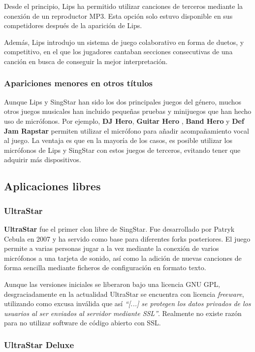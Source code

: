 Desde el principio, Lips ha permitido utilizar canciones de terceros mediante la
conexión de un reproductor MP3. Esta opción solo estuvo disponible en sus
competidores después de la aparición de Lips. 

Además, Lips introdujo un sistema de juego colaborativo en forma de duetos, y
competitivo, en el que los jugadores cantaban secciones consecutivas de una
canción en busca de conseguir la mejor interpretación.

\subsubsection{Apariciones menores en otros títulos}
Aunque Lips y SingStar han sido los dos principales juegos del género, muchos
otros juegos musicales han incluido pequeñas pruebas y minijuegos que han hecho
uso de micrófonos. Por ejemplo, \textbf{DJ Hero}, \textbf{Guitar Hero },
\textbf{Band Hero} y \textbf{Def Jam Rapstar} permiten utilizar el micrófono
para añadir acompañamiento vocal al juego. La ventaja es que en la mayoría de
los casos, es posible utilizar los micrófonos de Lips y SingStar con estos
juegos de terceros, evitando tener que adquirir más dispositivos.

\subsection{Aplicaciones libres}

\subsubsection{UltraStar}
\textbf{UltraStar} fue el primer clon libre de SingStar. Fue desarrollado por
Patryk Cebula en 2007 y ha servido como base para diferentes forks
posteriores. El juego permite a varias personas jugar a la vez mediante la
conexión de varios micrófonos a una tarjeta de sonido, así como la adición de
nuevas canciones de forma sencilla mediante ficheros de configuración en formato
texto.

Aunque las versiones iniciales se liberaron bajo una licencia GNU GPL,
desgraciadamente en la actualidad UltraStar se encuentra con licencia
\textit{freeware}, utilizando como excusa inválida que así \textit{``[...] se
  protegen los datos privados de los usuarios al ser enviados al servidor
  mediante SSL''}. Realmente no existe razón para no utilizar software de código
abierto con SSL.

\subsubsection{UltraStar Deluxe}

